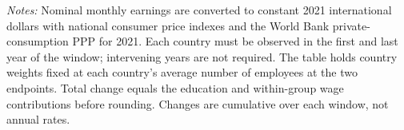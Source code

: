 \begin{table}[htbp]
\centering
\caption{Baseline decomposition of real monthly wage growth}
\label{tab:global_sample_decomposition}
\begin{minipage}{0.96\textwidth}
\textit{Notes:} Nominal monthly earnings are converted to constant 2021
international dollars with national consumer price indexes and the World
Bank private-consumption PPP for 2021. Each country must be observed in the
first and last year of the window; intervening years are not required. The
table holds country weights fixed at each country's average number of
employees at the two endpoints. Total change equals the education and
within-group wage contributions before rounding. Changes are cumulative over
each window, not annual rates.
\end{minipage}
\end{table}
